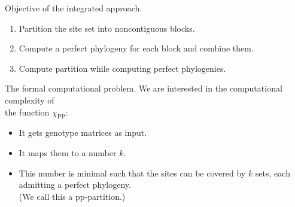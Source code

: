 \documentclass[aspectratio=169]{beamer}
\begin{document}
\begin{frame}{Objective of the integrated approach.}
  \begin{enumerate}
  \item Partition the site set into \alert{noncontiguous} blocks. 
  \item Compute a perfect phylogeny for each block and combine them. 
  \item<alert@1-> Compute partition while computing perfect
    phylogenies. 
  \end{enumerate}

\end{frame}


\begin{frame}{The formal computational problem.}
  We are interested in the computational complexity of \\
  \alert{the function \alert{$\chi_{\operatorname{PP}}$}}:
  \begin{itemize}
  \item It gets genotype matrices as input.
  \item It maps them to a number $k$.
  \item This number is minimal such that the sites can be
    covered by $k$ sets, each admitting a perfect phylogeny.
    \\
    (We call this a \alert{pp-partition}.)
  \end{itemize}
\end{frame}
\end{document}
